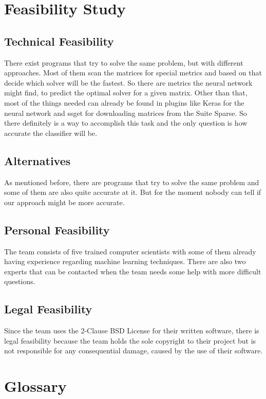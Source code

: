 \documentclass[parskip=full]{scrartcl}
\begin{document}
\section{Feasibility Study}
\subsection{Technical Feasibility}
There exist programs that try to solve the same problem, but with different approaches. 
Most of them scan the matrices for special metrics and based on that decide which solver will be the fastest. 
So there are metrics the \gls{neural network} might find, to predict the optimal solver for a given matrix. 
Other than that, most of the things needed can already be found in plugins like Keras for the \gls{neural network} and \gls{ssget} for downloading matrices from the \gls{Suite Sparse}. 
So there definitely is a way to accomplish this task and the only question is how accurate the \gls{classifier} will be.

\subsection{Alternatives}
As mentioned before, there are programs that try to solve the same problem and some of them are also quite accurate at it.
But for the moment nobody can tell if our approach might be more accurate.

\subsection{Personal Feasibility}
The team consists of five trained computer scientists with some of them already having experience regarding machine learning techniques.
There are also two experts that can be contacted when the team needs some help with more difficult questions.

\subsection{Legal Feasibility}
Since the team uses the 2-Clause BSD License for their written software, there is legal feasibility because the team holds the sole
copyright to their project but is not responsible for any consequential damage, caused by the use of their software.
\clearpage

\section{Glossary}

%
\printnoidxglossaries
\end{document}
